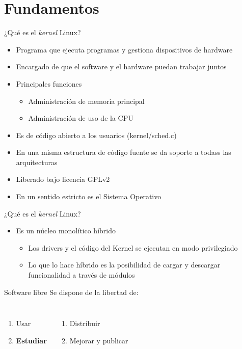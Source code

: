 \section{Fundamentos}

\begin{frame}{¿Qué es el \textit{kernel} Linux?}
  \begin{itemize}
  \item Programa que \alert{ejecuta} programas y \alert{gestiona}
    dispositivos de hardware
  \item Encargado de que el software y el hardware puedan trabajar juntos
  \item Principales funciones
    \begin{itemize}
    \item Administración de \alert{memoria principal}
    \item Administración de \alert{uso de la CPU}
    \end{itemize}
  \item Es de código abierto a los usuarios \alert{(kernel/sched.c)}
  \item En una misma estructura de código fuente se da soporte a \alert{todass las arquitecturas}
  \item Liberado bajo licencia GPLv2  
  \item En un sentido estricto es el Sistema Operativo
  \end{itemize}
\end{frame}

\begin{frame}{¿Qué es el \textit{kernel} Linux?}
  \begin{itemize}
  \item Es un núcleo monolítico híbrido
    \begin{itemize}
    \item Los drivers y el código del Kernel se ejecutan en modo privilegiado
    \item Lo que lo hace híbrido es la posibilidad de cargar y descargar funcionalidad a través de módulos
    \end{itemize}
  \end{itemize}
  \vfill
  \pause
  \begin{block}{Software libre}
    Se dispone de la \alert{libertad} de: \vspace{-2ex}
    \begin{columns}[t]
      \begin{enumerate}
      \item Usar
      \item \textbf{Estudiar}
      \end{enumerate}
      \begin{enumerate}\addtocounter{enumi}{2}
      \item Distribuir
      \item Mejorar y publicar
      \end{enumerate}
    \end{columns}
  \end{block}
\end{frame}

